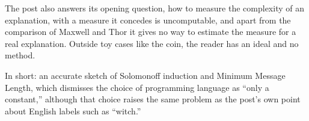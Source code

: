 \begin{afterword}
The post also answers its opening question, how to measure the complexity of an explanation, with a measure it concedes is uncomputable, and apart from the comparison of Maxwell and Thor it gives no way to estimate the measure for a real explanation. Outside toy cases like the coin, the reader has an ideal and no method.

In short: an accurate sketch of Solomonoff induction and Minimum Message Length, which dismisses the choice of programming language as ``only a constant,'' although that choice raises the same problem as the post's own point about English labels such as ``witch.''
\end{afterword}
